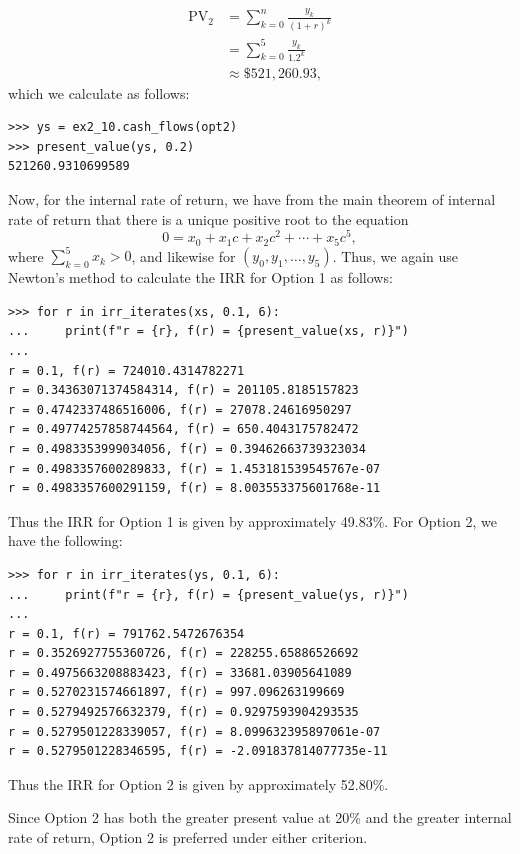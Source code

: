 \begin{itemize}
        \begin{equation*}
            \begin{split}
                \text{PV}_2 &= \sum_{k = 0}^n{\frac{y_k}{{(1 + r)}^k}} \\
                &= \sum_{k = 0}^5{\frac{y_k}{1.2^k}} \\
                &\approx \$521,260.93,
            \end{split}
        \end{equation*}
        which we calculate as follows:
        \begin{lstlisting}
>>> ys = ex2_10.cash_flows(opt2)
>>> present_value(ys, 0.2)
521260.9310699589
        \end{lstlisting}

        Now, for the internal rate of return, we have from the main theorem of
        internal rate of return that there is a unique positive root to the
        equation
        \[
            0 = x_0 + x_1c + x_2c^2 + \cdots + x_5 c^5,
        \]
        where $\sum_{k=0}^5 x_k > 0$, and likewise for
        $(y_0, y_1, \ldots, y_5)$. Thus, we again use Newton's method to
        calculate the IRR for Option 1 as follows:
        \begin{lstlisting}
>>> for r in irr_iterates(xs, 0.1, 6):
...     print(f"r = {r}, f(r) = {present_value(xs, r)}")
...
r = 0.1, f(r) = 724010.4314782271
r = 0.34363071374584314, f(r) = 201105.8185157823
r = 0.4742337486516006, f(r) = 27078.24616950297
r = 0.49774257858744564, f(r) = 650.4043175782472
r = 0.4983353999034056, f(r) = 0.39462663739323034
r = 0.4983357600289833, f(r) = 1.453181539545767e-07
r = 0.4983357600291159, f(r) = 8.003553375601768e-11
        \end{lstlisting}
        Thus the IRR for Option 1 is given by approximately 49.83\%. For
        Option 2, we have the following:
        \begin{lstlisting}
>>> for r in irr_iterates(ys, 0.1, 6):
...     print(f"r = {r}, f(r) = {present_value(ys, r)}")
...
r = 0.1, f(r) = 791762.5472676354
r = 0.3526927755360726, f(r) = 228255.65886526692
r = 0.4975663208883423, f(r) = 33681.03905641089
r = 0.5270231574661897, f(r) = 997.096263199669
r = 0.5279492576632379, f(r) = 0.9297593904293535
r = 0.5279501228339057, f(r) = 8.099632395897061e-07
r = 0.5279501228346595, f(r) = -2.091837814077735e-11
        \end{lstlisting}
        Thus the IRR for Option 2 is given by approximately 52.80\%.

        Since Option 2 has both the greater present value at 20\% and the
        greater internal rate of return, Option 2 is preferred under either
        criterion.
\end{itemize}
